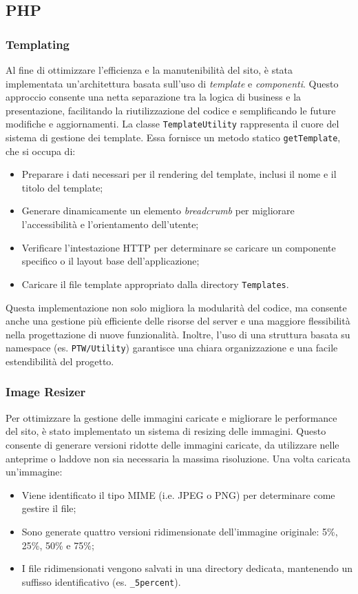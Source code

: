 \subsection{PHP}
\subsubsection{Templating}
Al fine di ottimizzare l'efficienza e la manutenibilit\`a del sito, \`e stata implementata un'architettura basata sull'uso di \textit{template} e \textit{componenti}. Questo approccio consente una netta separazione tra la logica di business e la presentazione, facilitando la riutilizzazione del codice e semplificando le future modifiche e aggiornamenti.
La classe \texttt{TemplateUtility} rappresenta il cuore del sistema di gestione dei template. Essa fornisce un metodo statico \texttt{getTemplate}, che si occupa di:
\begin{itemize}
\item Preparare i dati necessari per il rendering del template, inclusi il nome e il titolo del template;
\item Generare dinamicamente un elemento \textit{breadcrumb} per migliorare l'accessibilit\`a e l'orientamento dell'utente;
\item Verificare l'intestazione HTTP per determinare se caricare un componente specifico o il layout base dell'applicazione;
\item Caricare il file template appropriato dalla directory \texttt{Templates}.
\end{itemize}

Questa implementazione non solo migliora la modularit\`a del codice, ma consente anche una gestione pi\`u efficiente delle risorse del server e una maggiore flessibilit\`a nella progettazione di nuove funzionalit\`a. Inoltre, l'uso di una struttura basata su namespace (es. \texttt{PTW/Utility}) garantisce una chiara organizzazione e una facile estendibilit\`a del progetto.

\subsubsection{Image Resizer}
Per ottimizzare la gestione delle immagini caricate e migliorare le performance del sito, \`e stato implementato un sistema di resizing delle immagini. Questo consente di generare versioni ridotte delle immagini caricate, da utilizzare nelle anteprime o laddove non sia necessaria la massima risoluzione.
Una volta caricata un'immagine:
\begin{itemize}
    \item Viene identificato il tipo MIME (i.e. JPEG o PNG) per determinare come gestire il file;
    \item Sono generate quattro versioni ridimensionate dell'immagine originale: 5\%, 25\%, 50\% e 75\%;
    \item I file ridimensionati vengono salvati in una directory dedicata, mantenendo un suffisso identificativo (es. \texttt{\_5percent}).
\end{itemize}

